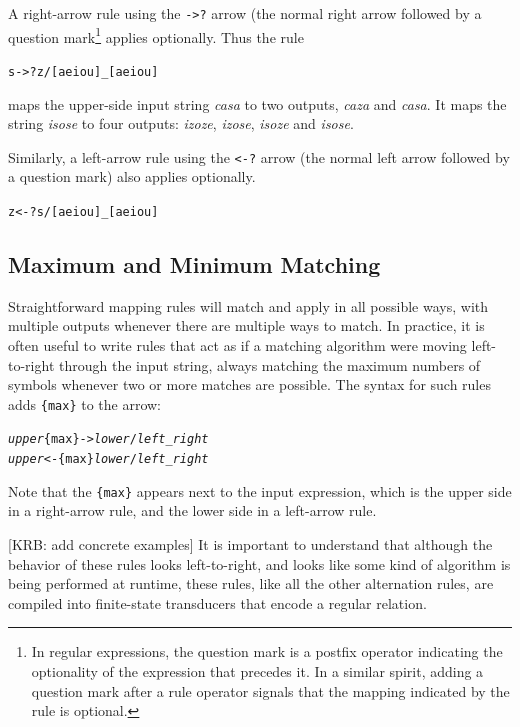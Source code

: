 \documentclass[letterpaper,12pt]{article}
\begin{document}
A right-arrow rule using the \texttt{->?} arrow (the normal right arrow followed by a question
mark\footnote{In regular expressions, the question mark is a postfix operator indicating the optionality of the expression that
precedes it.  In a similar spirit, adding a question mark after a rule operator signals that the mapping indicated by the rule is
optional.} applies optionally.  Thus
the rule

\begin{alltt}
s ->? z / [aeiou] _ [aeiou]
\end{alltt}

\noindent
maps the upper-side input string \emph{casa} to two outputs, \emph{caza} and
\emph{casa}.  It maps the string \emph{isose} to four outputs:
\emph{izoze}, \emph{izose}, \emph{isoze} and \emph{isose}.

Similarly, a left-arrow rule using the \texttt{<-?} arrow (the normal left arrow followed by a question mark) also
applies optionally.

\begin{alltt}
z <-? s / [aeiou] _ [aeiou]
\end{alltt}

\subsection{Maximum and Minimum Matching}

Straightforward mapping rules will match and apply in all possible ways, with multiple outputs whenever there are
multiple ways to match.  In practice, it is often useful to write rules that act as if a matching algorithm were moving
left-to-right through the input string, always matching the maximum numbers of symbols whenever two or more matches are
possible.  The syntax for such rules adds \verb!{max}! to the arrow:

\begin{alltt}
\emph{upper} \{max\}-> \emph{lower} / \emph{left} _ \emph{right}
\emph{upper} <-\{max\} \emph{lower} / \emph{left} _ \emph{right}
\end{alltt}

\noindent
Note that the \verb!{max}! appears next to the input expression, which is the upper side in a right-arrow rule, and the lower side
in a left-arrow rule.

[KRB: add concrete examples]  It is important to understand that although the behavior of these rules looks
left-to-right, and looks like some kind of algorithm is being performed at runtime, these rules, like all the other
alternation rules, are compiled into finite-state transducers that encode a regular relation.
\end{document}
